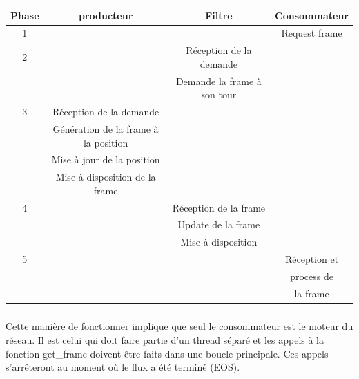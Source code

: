 \begin{center}

  \begin{tabular}{ | c | c | c | c |}

    \hline

      Phase & producteur              & Filtre                      &
      Consommateur    \\ \hline \hline

      1     &                         &                             &
      Request frame   \\ \hline 2     &                         &
      Réception de la demande     &                 \\
            &                         & Demande la frame à son tour&
            \\ \hline
      3     & Réception de la demande &                             & \\
            & Génération de la frame à la position &                &
            \\ & Mise à jour de la position          &                &
            \\ & Mise à disposition de la frame       &                &
            \\ \hline
      4     &                         & Réception de la frame       & \\
            &                         & Update de la frame          &
            \\ & & Mise à disposition          & \\ \hline
      5     &                         &                             &
      Réception et    \\
            &                         &                             &
            process de      \\ &                         & & la
            frame        \\

    \hline

  \end{tabular}

\end{center}

\subparagraph{}

Cette manière de fonctionner implique que seul le consommateur est
le moteur du réseau. Il est celui qui doit faire partie d'un thread
séparé et les appels à la fonction get\_frame doivent être faits dans
une boucle principale.  Ces appels s'arrêteront au moment où le flux a
été terminé (EOS).


